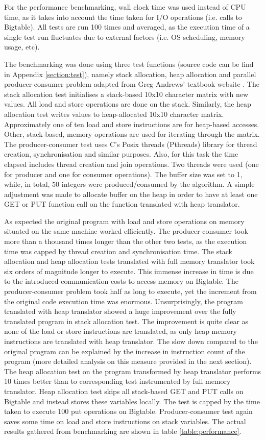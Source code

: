 \documentclass[bsc,frontabs,twoside,singlespacing,parskip,deptreport]{infthesis}     %
\begin{document}
For the performance benchmarking, wall clock time was used instead of CPU time, as it takes into account the time taken for I/O operations (i.e. calls to Bigtable). All tests are run 100 times and averaged, as the execution time of a single test run fluctuates due to external factors (i.e. OS scheduling, memory usage, etc).

The benchmarking was done using three test functions (source code can be find in Appendix \ref{section:test}), namely stack allocation, heap allocation and parallel producer-consumer problem adapted from Greg Andrews' textbook website \citep{producer-consumer}. The stack allocation test initialises a stack-based 10x10 character matrix with new values. All load and store operations are done on the stack. Similarly, the heap allocation test writes values to heap-allocated 10x10 character matrix. Approximately one of ten load and store instructions are for heap-based accesses. Other, stack-based, memory operations are used for iterating through the matrix. The producer-consumer test uses C's Posix threads (Pthreads) library for thread creation, synchronisation and similar purposes. Also, for this task the time elapsed includes thread creation and join operations. Two threads were used (one for producer and one for consumer operations). The buffer size was set to 1, while, in total, 50 integers were produced/consumed by the algorithm. A simple adjustment was made to allocate buffer on the heap in order to have at least one GET or PUT function call on the function translated with heap translator.

As expected the original program with load and store operations on memory situated on the same machine worked efficiently. The producer-consumer took more than a thousand times longer than the other two tests, as the execution time was capped by thread creation and synchronisation time. The stack allocation and heap allocation tests translated with full memory translator took six orders of magnitude longer to execute. This immense increase in time is due to the introduced communication costs to access memory on Bigtable. The producer-consumer problem took half as long to execute, yet the increment from the original code execution time was enormous. Unsurprisingly, the program translated with heap translator showed a huge improvement over the fully translated program in stack allocation test. The improvement is quite clear as none of the load or store instructions are translated, as only heap memory instructions are translated with heap translator. The slow down compared to the original program can be explained by the increase in instruction count of the program (more detailed analysis on this measure provided in the next section). The heap allocation test on the program transformed by heap translator performs 10 times better than to corresponding test instrumented by full memory translator. Heap allocation test skips all stack-based GET and PUT calls on Bigtable and instead stores these variables locally. The test is capped by the time taken to execute 100 put operations on Bigtable. Producer-consumer test again saves some time on load and store instructions on stack variables. The actual results gathered from benchmarking are shown in table \ref{table:performance}.
\end{document}
